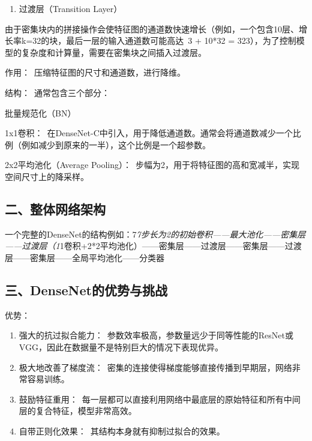 \begin{enumerate}
\def\labelenumi{\arabic{enumi}.}
\setcounter{enumi}{1}
\tightlist
\item
  过渡层（Transition Layer）
\end{enumerate}

由于密集块内的拼接操作会使特征图的通道数快速增长（例如，一个包含10层、增长率k=32的块，最后一层的输入通道数可能高达~3 + 10*32 = 323），为了控制模型的复杂度和计算量，需要在密集块之间插入过渡层。

作用：~压缩特征图的尺寸和通道数，进行降维。

结构：~通常包含三个部分：

批量规范化（BN）

1x1卷积：~在DenseNet-C中引入，用于降低通道数。通常会将通道数减少一个比例（例如减少到原来的一半），这个比例是一个超参数。

2x2平均池化（Average Pooling）：~步幅为2，用于将特征图的高和宽减半，实现空间尺寸上的降采样。

\hypertarget{ux4e8cux6574ux4f53ux7f51ux7edcux67b6ux6784}{%
\subsection{二、整体网络架构}\label{ux4e8cux6574ux4f53ux7f51ux7edcux67b6ux6784}}

一个完整的DenseNet的结构例如：7\emph{7步长为2的初始卷积------最大池化------密集层------过渡层（1}1卷积+2*2平均池化）------密集层------过渡层------密集层------过渡层------密集层------全局平均池化------分类器

\hypertarget{ux4e09densenetux7684ux4f18ux52bfux4e0eux6311ux6218}{%
\subsection{三、DenseNet的优势与挑战}\label{ux4e09densenetux7684ux4f18ux52bfux4e0eux6311ux6218}}

优势：

\begin{enumerate}
\def\labelenumi{\arabic{enumi}.}
\item
  强大的抗过拟合能力：~参数效率极高，参数量远少于同等性能的ResNet或VGG，因此在数据量不是特别巨大的情况下表现优异。
\item
  极大地改善了梯度流：~密集的连接使得梯度能够直接传播到早期层，网络非常容易训练。
\item
  鼓励特征重用：~每一层都可以直接利用网络中最底层的原始特征和所有中间层的复合特征，模型非常高效。
\item
  自带正则化效果：~其结构本身就有抑制过拟合的效果。
\end{enumerate}

